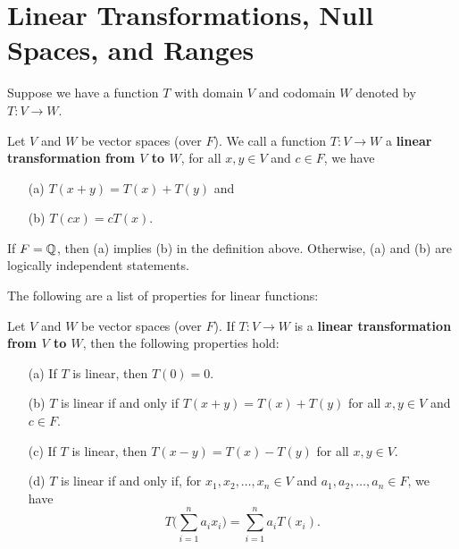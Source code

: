 \section{Linear Transformations, Null Spaces, and Ranges}

Suppose we have a function \( T  \) with domain \( V  \) and codomain \( W  \) denoted by \( T: V \to W  \).


\begin{definition}\label{Linear Transformation}
   Let \( V  \) and \( W  \) be vector spaces (over \( F  \)). We call a function \( T: V \to W  \) a \textbf{linear transformation from \( V  \) to \( W  \)}, for all \( x,y \in V  \) and \( c \in F  \), we have
   \begin{enumerate}
       \item[(a)] \( T(x+y) = T(x) + T(y) \) and
        \item[(b)] \( T(cx) = c T(x) \).
   \end{enumerate}
\end{definition}

\begin{remark}
    If \( F = \mathbb{Q}   \), then (a) implies (b) in the definition above. Otherwise, (a) and (b) are logically independent statements.  
\end{remark}

The following are a list of properties for linear functions:

\begin{prop}
    Let \( V  \) and \( W  \) be vector spaces (over \( F \)). If \( T: V \to W   \) is a \textbf{linear transformation from \( V \) to \( W  \)}, then the following properties hold:
    \begin{enumerate}
        \item[(a)] If \( T  \) is linear, then \( T(0) = 0  \). 
        \item[(b)] \( T  \) is linear if and only if \( T(x+y) = T(x) + T(y) \) for all \( x,y \in V  \) and \( c \in F  \).
        \item[(c)] If \( T  \) is linear, then \( T(x-y) = T(x) - T(y)  \) for all \( x,y \in V  \).
        \item[(d)] \( T  \) is linear if and only if, for \( x_{1}, x_{2}, \dots, x_{n} \in V  \) and \( a_{1}, a_{2}, \dots, a_{n} \in F  \), we have
            \[  T \Big( \sum_{ i=1 }^{ n }a_{i}x_{i}  \Big) = \sum_{ i=1 }^{ n } a_{i} T(x_{i}). \]
    \end{enumerate}
\end{prop}

